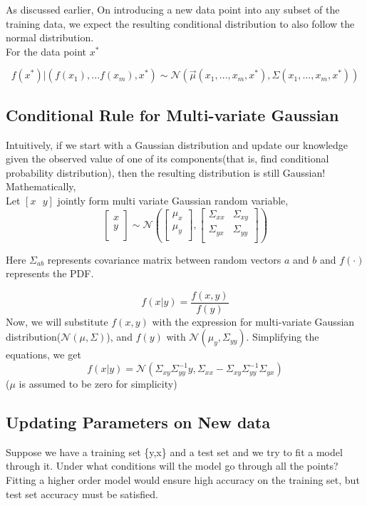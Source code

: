 \documentclass[12pt]{article}
\begin{document}
As discussed earlier, On introducing a new data point into any subset of the training data, we expect the resulting conditional distribution to also follow the normal distribution. \\

For the data point $x^*$

\[
f(x^*) \vert (f(x_1), \dots f(x_m), x^*) \sim \mathcal{N}(\vec{\mu}(x_1,\dots,x_m,x^*), \Sigma(x_1,\dots,x_m,x^*))
\]

\subsection{Conditional Rule for Multi-variate Gaussian}

Intuitively, if we start with a Gaussian distribution and update our knowledge given the observed value of one of its components(that is, find conditional probability distribution), then the resulting distribution is still Gaussian! Mathematically,\\
Let $[x \text{ }y]$ jointly form multi variate Gaussian random variable,
\[
\begin{bmatrix}
    x \\
    y \\
\end{bmatrix} \sim
\mathcal{N}
\left(
\begin{bmatrix}
    \mu_x \\
    \mu_y \\
\end{bmatrix},
\begin{bmatrix}
    \Sigma_{xx} & \Sigma_{xy}\\
    \Sigma_{yx} & \Sigma_{yy}\\
\end{bmatrix}
\right)
\]

Here $\Sigma_{ab}$ represents covariance matrix between random vectors $a$ and $b$ and $f(\cdot)$ represents the PDF.

\[f(x\vert y) = \frac{f(x,y)}{f(y)}\]
Now, we will substitute $f(x,y)$ with the expression for multi-variate Gaussian distribution($\mathcal{N}(\mu, \Sigma)$), and $f(y)$ with $\mathcal{N}(\mu_{y}, \Sigma_{yy})$. 
Simplifying the equations, we get
\[
f(x\vert y)=
\mathcal{N}
(\Sigma_{xy}\Sigma_{yy}^{-1}y,
\Sigma_{xx} - \Sigma_{xy}\Sigma_{yy}^{-1}\Sigma_{yx})
\]
($\mu$ is assumed to be zero for simplicity)\\

\subsection{Updating Parameters on New data}
Suppose we have a training set \{y,x\} and a test set and we try to fit a model through it. Under what conditions will the model go through all the points? Fitting a higher order model would ensure high accuracy on the training set, but test set accuracy must be satisfied.\\
\end{document}
